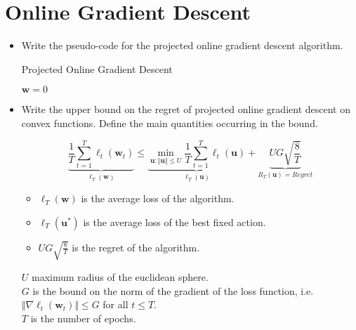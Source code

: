 \newpage
\section{Online Gradient Descent}

\begin{itemize}

    \item Write the pseudo-code for the projected online gradient descent algorithm. 

    \begin{algorithm}[H]
        \SetAlgoLined
        \DontPrintSemicolon
        \caption{Projected Online Gradient Descent}
        $\boldsymbol{w} = 0$\\
    \end{algorithm}

    \item Write the upper bound on the regret of projected online gradient descent on convex functions. Define the main quantities occurring in the bound.

        $$
        \underbrace{\frac{1}{T} \sum_{t=1}^{T} \ell_{t}(\boldsymbol{w}_{t})}_{\ell_T(\boldsymbol{w})} \leq \underbrace{\min_{\boldsymbol{u} : \Vert \boldsymbol{u} \Vert \leq U} \frac{1}{T} \sum_{t=1}^{T} \ell_{t}(\boldsymbol{u})}_{\ell_T(\boldsymbol{u})} + \underbrace{UG \sqrt{\frac{8}{T}}}_{R_T(\boldsymbol{u}) = Regret}
        $$

        \begin{itemize}
            \item $\ell_T(\boldsymbol{w})$ is the average loss of the algorithm.
            \item $\ell_T(\boldsymbol{u^*})$ is the average loss of the best fixed action.
            \item $UG \sqrt{\frac{8}{T}}$ is the regret of the algorithm.
        \end{itemize}
        
        $U$ maximum radius of the euclidean sphere.\\
        $G$ is the bound on the norm of the gradient of the loss function, i.e. $\Vert \nabla \ell_{t}(\boldsymbol{w}_{t}) \Vert \leq G$ for all $t \leq T$.\\
        $T$ is the number of epochs.


\end{itemize}
